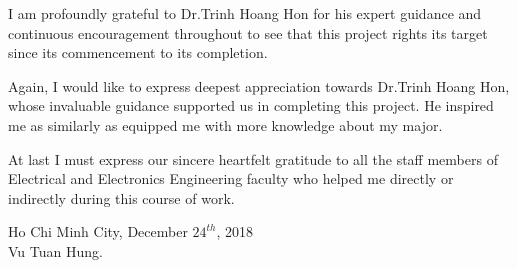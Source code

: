 I am profoundly grateful to Dr.Trinh Hoang Hon for his expert guidance and continuous encouragement throughout to see that this project rights its target since its commencement to its completion.

Again, I would like to express deepest appreciation towards Dr.Trinh Hoang Hon, whose invaluable guidance supported us in completing this project. He inspired me as similarly as equipped me with more knowledge about my major.

At last I must express our sincere heartfelt gratitude to all the staff members of Electrical and Electronics Engineering faculty who helped me directly or indirectly during this course of work.

\begin{flushright}
    Ho Chi Minh City, December $24^{th}$, 2018\\
    Vu Tuan Hung.
\end{flushright}
